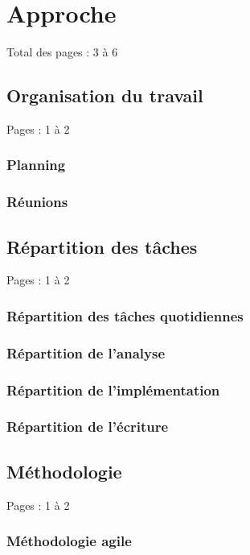 \documentclass{eplmastersthesis_FR}
\begin{document}


	\chapter{Approche}

		Total des pages : 3 à 6

		\section{Organisation du travail}

			Pages : 1 à 2

			\subsection*{Planning}
			\subsection*{Réunions}

		\section{Répartition des tâches}

			Pages : 1 à 2

			\subsection*{Répartition des tâches quotidiennes}
			\subsection*{Répartition de l'analyse}
			\subsection*{Répartition de l'implémentation}
			\subsection*{Répartition de l'écriture}

		\section{Méthodologie}

			Pages : 1 à 2

			\subsection*{Méthodologie agile}
\end{document}
